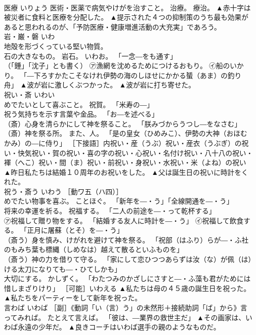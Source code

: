 \documentclass[8pt]{extreport}
\begin{document}
\begin{CJK}{UTF8}{min}
\\	医療	いりょう	医術・医薬で病気やけがを治すこと。 治療。 療治。	▲赤十字は被災者に食料と医療を分配した。 ▲提示された４つの抑制策のうち最も効果があると思われるのが、「予防医療・健康増進活動の大充実」であろう。
\\	岩・巌・磐	いわ	
\\	地殻を形づくっている堅い物質。 
\\	石の大きなもの。 岩石。 いわお。 「一念―をも通す」 
\\	（「錘」「沈子」とも書く） ㋐漁網を沈めるためにつけるおもり。 ㋑船のいかり。 「―下ろすかたこそなけれ伊勢の海のしほせにかかる蜑（あま）の釣り舟」	▲波が岩に激しくぶつかった。 ▲波が岩に打ち寄せた。
\\	祝い・斎	いわい	
\\	めでたいとして喜ぶこと。 祝賀。 「米寿の―」 
\\	祝う気持ちを示す言葉や金品。 「お―を述べる」 
\\	（斎）心身を清らかにして神を祭ること。 「朕みづからうつし―をなさむ」 
\\	（斎）神を祭る所。 また、人。 「是の皇女（ひめみこ）、伊勢の大神（おほむかみ）の―に侍り」 ［下接語］内祝い・産（うぶ）祝い・産衣（うぶぎ）の祝い・快気祝い・賀の祝い・喜の字の祝い・心祝い・名付け祝い・八十八の祝い・褌（へこ）祝い・間（ま）祝い・前祝い・身祝い・水祝い・米（よね）の祝い	▲昨日私たちは結婚１０周年のお祝いをした。 ▲父は誕生日の祝いに時計をくれた。
\\	祝う・斎う	いわう	［動ワ五（ハ四）］ 
\\	めでたい物事を喜ぶ。 ことほぐ。 「新年を―・う」「全線開通を―・う」 
\\	将来の幸運を祈る。 祝福する。 「二人の前途を―・って乾杯する」 
\\	㋐祝福して贈り物をする。 「結婚する友人に時計を―・う」 ㋑祝福して飲食する。 「正月に屠蘇（とそ）を―・う」 
\\	（斎う）身を慎み、けがれを避けて神を祭る。 「祝部（はふり）らが―・ふ社のもみち葉も標縄（しめなは）越えて散るといふものを」 
\\	（斎う）神の力を借りて守る。 「家にして恋ひつつあらずは汝（な）が佩（は）ける太刀になりても―・ひてしかも」 
\\	大切にする。 かしずく。 「わたつみのかざしにさすと―・ふ藻も君がためには惜しまざりけり」 ［可能］いわえる	▲私たちは母の４５歳の誕生日を祝った。 ▲私たちをパーティーをして新年を祝った。
\\	言わば	いわば	［副］《動詞「い（言）う」の未然形＋接続助詞「ば」から》言ってみれば。 たとえて言えば。 「彼は、―業界の救世主だ」	▲その画家は、いわば永遠の少年だ。 ▲良きコーチはいわば選手の親のようなものだ。

\end{CJK}
\end{document}
